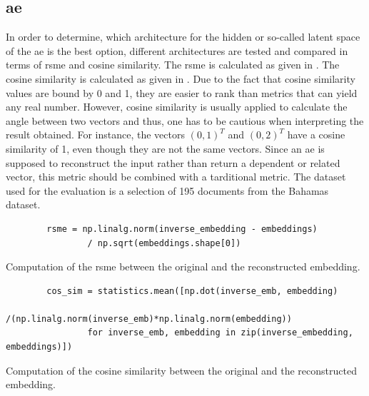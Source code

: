 \subsection*{\ac{ae}}\label{subsec:evaluation-ae}

In order to determine, which architecture for the hidden or so-called latent space of the \ac{ae} is the best option, 
different architectures are tested and compared in terms of \ac{rsme} and cosine similarity.
The \ac{rsme} is calculated as given in .
The cosine similarity is calculated as given in .
Due to the fact that cosine similarity values are bound by 0 and 1, they are easier to rank than metrics that can yield any real number.
However, cosine similarity is usually applied to calculate the angle between two vectors and thus, one has to be cautious when interpreting the result obtained.
For instance, the vectors $\left( 0, 1 \right)^T$ and $\left( 0, 2 \right)^T$ have a cosine similarity of 1, even though they are not the same vectors.
Since an \ac{ae} is supposed to reconstruct the input rather than return a dependent or related vector, this metric should be combined with a tarditional metric.
The dataset used for the evaluation is a selection of 195 documents from the Bahamas dataset.

\begin{listing}[htp]
    \begin{verbatim}
        rsme = np.linalg.norm(inverse_embedding - embeddings) 
                / np.sqrt(embeddings.shape[0])
    \end{verbatim}
    \caption[Computation of the \ac{rsme}]{
        Computation of the \ac{rsme} between the original and the reconstructed embedding.
    }
    \label{lst:impl-rsme}
\end{listing}

\begin{listing}[htp]
    \begin{verbatim}
        cos_sim = statistics.mean([np.dot(inverse_emb, embedding)
                /(np.linalg.norm(inverse_emb)*np.linalg.norm(embedding)) 
                for inverse_emb, embedding in zip(inverse_embedding, embeddings)])
    \end{verbatim}
    \caption[Computation of the cosine similarity]{
        Computation of the cosine similarity between the original and the reconstructed embedding.
    }
    \label{lst:impl-cos_sim}
\end{listing}

